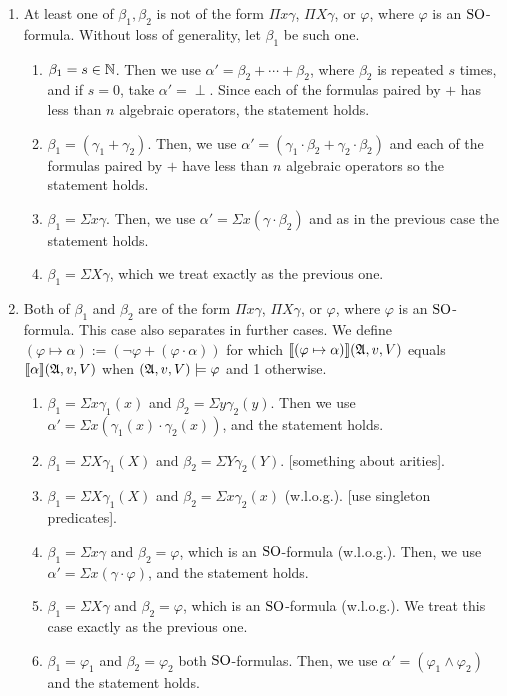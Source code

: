 \begin{enumerate}
	\item At least one of $\beta_1, \beta_2$ is not of the form $\Pi x \gamma$, $\Pi X \gamma$, or $\varphi$, where $\varphi$ is an ${\rm SO}$-formula. Without loss of generality, let $\beta_1$ be such one.
	\begin{enumerate}
		\item $\beta_1 = s \in \mathbb{N}$. Then we use $\alpha' = \beta_2 + \cdots + \beta_2$, where $\beta_2$ is repeated $s$ times, and if $s = 0$, take $\alpha' = \perp$. Since each of the formulas paired by $+$ has less than $n$ algebraic operators, the statement holds.
		\item $\beta_1 = (\gamma_1 + \gamma_2)$. Then, we use $\alpha' = (\gamma_1\cdot\beta_2 + \gamma_2\cdot\beta_2)$ and each of the formulas paired by $+$ have less than $n$ algebraic operators so the statement holds.
		\item $\beta_1 = \Sigma x \gamma$. Then, we use $\alpha' = \Sigma x (\gamma\cdot\beta_2)$ and as in the previous case the statement holds.
		\item $\beta_1 = \Sigma X \gamma$, which we treat exactly as the previous one.
	\end{enumerate}
	\item Both of $\beta_1$ and $\beta_2$ are of the form $\Pi x \gamma$, $\Pi X \gamma$, or $\varphi$, where $\varphi$ is an ${\rm SO}$-formula. This case also separates in further cases. We define $(\varphi \mapsto \alpha) := (\neg\varphi + (\varphi\cdot\alpha))$ for which ${\llbracket{}{(\varphi \mapsto \alpha)}\rrbracket}(\mathfrak{A},v,V)$ equals ${\llbracket{}{\alpha}\rrbracket}(\mathfrak{A},v,V)$ when $(\mathfrak{A},v,V)\models\varphi$ and 1 otherwise.
	\begin{enumerate}
		\item $\beta_1 = \Sigma x \gamma_1(x)$ and $\beta_2 = \Sigma y \gamma_2(y)$. Then we use $\alpha' = \Sigma x(\gamma_1(x)\cdot\gamma_2(x))$, and the statement holds.
		\item $\beta_1 = \Sigma X \gamma_1(X)$ and $\beta_2 = \Sigma Y \gamma_2(Y)$. [something about arities].
		\item $\beta_1 = \Sigma X \gamma_1(X)$ and $\beta_2 = \Sigma x \gamma_2(x)$ (w.l.o.g.). [use singleton predicates].
		\item $\beta_1 = \Sigma x \gamma$ and $\beta_2 = \varphi$, which is an ${\rm SO}$-formula (w.l.o.g.). Then, we use $\alpha' = \Sigma x (\gamma \cdot \varphi)$, and the statement holds.
		\item $\beta_1 = \Sigma X \gamma$ and $\beta_2 = \varphi$, which is an ${\rm SO}$-formula (w.l.o.g.). We treat this case exactly as the previous one.
		\item $\beta_1 = \varphi_1$ and $\beta_2 = \varphi_2$ both ${\rm SO}$-formulas. Then, we use $\alpha' = (\varphi_1 \wedge \varphi_2)$ and the statement holds.
	\end{enumerate}
\end{enumerate}


